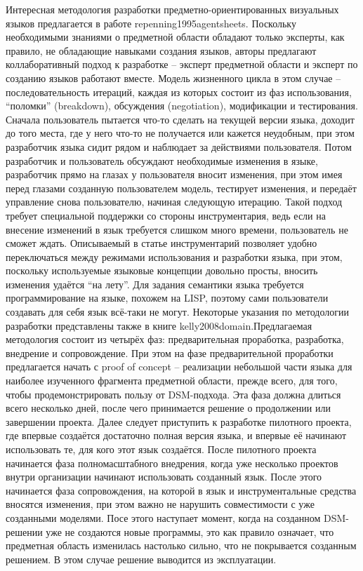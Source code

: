 	Интересная методология разработки предметно-ориентированных визуальных языков предлагается в работе repenning1995agentsheets. Поскольку необходимыми знаниями о предметной области обладают только эксперты, как правило, не обладающие навыками создания языков, авторы предлагают коллаборативный подход к разработке – эксперт предметной области и эксперт по созданию языков работают вместе. Модель жизненного цикла в этом случае – последовательность итераций, каждая из которых состоит из фаз использования, “поломки” (breakdown), обсуждения (negotiation), модификации и тестирования. Сначала пользователь пытается что-то сделать на текущей версии языка, доходит до того места, где у него что-то не получается или кажется неудобным, при этом разработчик языка сидит рядом и наблюдает за действиями пользователя. Потом разработчик и пользователь обсуждают необходимые изменения в языке, разработчик прямо на глазах у пользователя вносит изменения, при этом имея перед глазами созданную пользователем модель, тестирует изменения, и передаёт управление снова пользователю, начиная следующую итерацию. Такой подход требует специальной поддержки со стороны инструментария, ведь если на внесение изменений в язык требуется слишком много времени, пользователь не сможет ждать. Описываемый в статье инструментарий позволяет удобно переключаться между режимами использования и разработки языка, при этом, поскольку используемые языковые концепции довольно просты, вносить изменения удаётся “на лету”. Для задания семантики языка требуется программирование на языке, похожем на LISP, поэтому сами пользователи создавать для себя язык всё-таки не могут.
	Некоторые указания по методологии разработки представлены также в книге kelly2008domain.Предлагаемая методология состоит из четырёх фаз: предварительная проработка, разработка, внедрение и сопровождение. При этом на фазе предварительной проработки предлагается начать с proof of concept – реализации небольшой части языка для наиболее изученного фрагмента предметной области, прежде всего, для того, чтобы продемонстрировать пользу от DSM-подхода. Эта фаза должна длиться всего несколько дней, после чего принимается решение о продолжении или завершении проекта. Далее следует приступить к разработке пилотного проекта, где впервые создаётся достаточно полная версия языка, и впервые её начинают использовать те, для кого этот язык создаётся. После пилотного проекта начинается фаза полномасштабного внедрения, когда уже несколько проектов внутри организации начинают использовать созданный язык. После этого начинается фаза сопровождения, на которой в язык и инструментальные средства вносятся изменения, при этом важно не нарушить совместимости с уже созданными моделями. Посе этого наступает момент, когда на созданном DSM-решении уже не создаются новые программы, это как правило означает, что предметная область изменилась настолько сильно, что не покрывается созданным решением. В этом случае решение выводится из эксплуатации.
